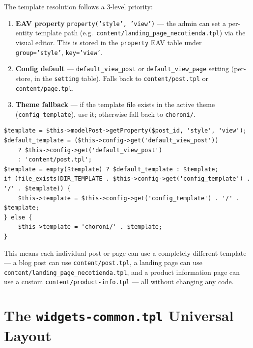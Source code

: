 \documentclass[11pt,a4paper]{article}
\begin{document}
The template resolution follows a 3-level priority:

\begin{enumerate}[leftmargin=1.6em,itemsep=2pt]
  \item \textbf{EAV property} \texttt{property('style', 'view')} --- the
        admin can set a per-entity template path (e.g.\
        \texttt{content/landing\_page\_necotienda.tpl}) via the visual
        editor. This is stored in the \texttt{property} EAV table under
        \texttt{group='style'}, \texttt{key='view'}.
  \item \textbf{Config default} --- \texttt{default\_view\_post} or
        \texttt{default\_view\_page} setting (per-store, in the
        \texttt{setting} table). Falls back to
        \texttt{content/post.tpl} or \texttt{content/page.tpl}.
  \item \textbf{Theme fallback} --- if the template file exists in the
        active theme (\texttt{config\_template}), use it; otherwise fall
        back to \texttt{choroni/}.
\end{enumerate}

\begin{lstlisting}[caption={Per-entity template override (from \texttt{content/post.php}).},label={lst:template-override}]
$template = $this->modelPost->getProperty($post_id, 'style', 'view');
$default_template = ($this->config->get('default_view_post'))
    ? $this->config->get('default_view_post')
    : 'content/post.tpl';
$template = empty($template) ? $default_template : $template;
if (file_exists(DIR_TEMPLATE . $this->config->get('config_template') . '/' . $template)) {
    $this->template = $this->config->get('config_template') . '/' . $template;
} else {
    $this->template = 'choroni/' . $template;
}
\end{lstlisting}

This means each individual post or page can use a completely different
template --- a blog post can use \texttt{content/post.tpl}, a landing page
can use \texttt{content/landing\_page\_necotienda.tpl}, and a product
information page can use a custom \texttt{content/product-info.tpl} --- all
without changing any code.

\section{The \texttt{widgets-common.tpl} Universal Layout}\label{sec:widgets-common}
\end{document}
